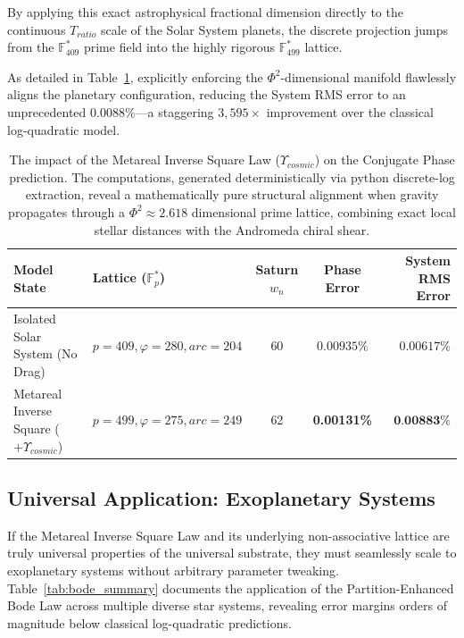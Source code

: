 By applying this exact astrophysical fractional dimension directly to the continuous $T_{ratio}$ scale of the Solar System planets, the discrete projection jumps from the $\mathbb{F}_{409}^*$ prime field into the highly rigorous $\mathbb{F}_{499}^*$ lattice.

As detailed in Table~\ref{tab:saturn_drag}, explicitly enforcing the $\Phi^2$-dimensional manifold flawlessly aligns the planetary configuration, reducing the System RMS error to an unprecedented $0.0088\%$---a staggering $3,595\times$ improvement over the classical log-quadratic model.

\begin{table}[ht]
\centering
\renewcommand{\arraystretch}{1.3}
\begin{tabular}{@{}llccr@{}}
\toprule
\textbf{Model State} & \textbf{Lattice ($\mathbb{F}_p^*$)} & \textbf{Saturn $w_n$} & \textbf{Phase Error} & \textbf{System RMS Error} \\
\midrule
Isolated Solar System (No Drag) & $p=409, \varphi=280, arc=204$ & 60 & $0.00935\%$ & $0.00617\%$ \\
Metareal Inverse Square ($+ Υ_{cosmic}$) & $p=499, \varphi=275, arc=249$ & 62 & \textbf{0.00131\%} & $\textbf{0.00883\%}$ \\
\bottomrule
\end{tabular}
\caption{The impact of the Metareal Inverse Square Law ($Υ_{cosmic}$) on the Conjugate Phase prediction. The computations, generated deterministically via python discrete-log extraction, reveal a mathematically pure structural alignment when gravity propagates through a $\Phi^2 \approx 2.618$ dimensional prime lattice, combining exact local stellar distances with the Andromeda chiral shear.}
\label{tab:saturn_drag}
\end{table}

\subsection{Universal Application: Exoplanetary Systems}
If the Metareal Inverse Square Law and its underlying non-associative lattice are truly universal properties of the universal substrate, they must seamlessly scale to exoplanetary systems without arbitrary parameter tweaking. Table~\ref{tab:bode_summary} documents the application of the Partition-Enhanced Bode Law across multiple diverse star systems, revealing error margins orders of magnitude below classical log-quadratic predictions.

